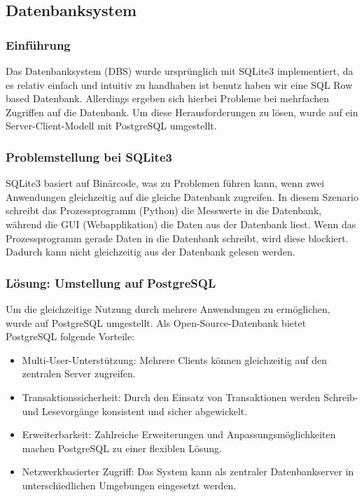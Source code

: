 \subsection{Datenbanksystem}\label{subsec:datenbanksystem}


\subsubsection{Einführung}

Das Datenbanksystem (DBS) wurde ursprünglich mit SQLite3 implementiert, da es relativ einfach und intuitiv zu handhaben ist benutz haben wir eine SQL Row based Datenbank. Allerdings ergeben sich hierbei Probleme bei mehrfachen Zugriffen auf die Datenbank. Um diese Herausforderungen zu lösen, wurde auf ein Server-Client-Modell mit PostgreSQL umgestellt.


\subsubsection{Problemstellung bei SQLite3}

SQLite3 basiert auf Binärcode, was zu Problemen führen kann, wenn zwei Anwendungen gleichzeitig auf die gleiche Datenbank zugreifen. In diesem Szenario schreibt das Prozessprogramm (Python) die Messwerte in die Datenbank, während die GUI (Webapplikation) die Daten aus der Datenbank liest. Wenn das Prozessprogramm gerade Daten in die Datenbank schreibt, wird diese blockiert. Dadurch kann nicht gleichzeitig aus der Datenbank gelesen werden.


\subsubsection{Lösung: Umstellung auf PostgreSQL}

Um die gleichzeitige Nutzung durch mehrere Anwendungen zu ermöglichen, wurde auf PostgreSQL umgestellt. Als Open-Source-Datenbank bietet PostgreSQL folgende Vorteile:

\begin{itemize}
    \item Multi-User-Unterstützung: Mehrere Clients können gleichzeitig auf den zentralen Server zugreifen.
    \item Transaktionssicherheit: Durch den Einsatz von Transaktionen werden Schreib- und Lesevorgänge konsistent und sicher abgewickelt.
    \item Erweiterbarkeit: Zahlreiche Erweiterungen und Anpassungsmöglichkeiten machen PostgreSQL zu einer flexiblen Lösung.
    \item Netzwerkbasierter Zugriff: Das System kann als zentraler Datenbankserver in unterschiedlichen Umgebungen eingesetzt werden.
\end{itemize}

